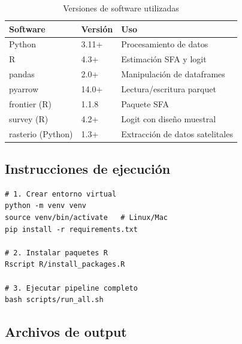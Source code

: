 \documentclass[11pt,a4paper]{article}
\begin{document}
\begin{table}[H]
\centering
\caption{Versiones de software utilizadas}
\label{tab:software_versions}
\begin{threeparttable}
\small
\begin{tabular}{lll}
\toprule
\textbf{Software} & \textbf{Versión} & \textbf{Uso} \\
\midrule
Python & 3.11+ & Procesamiento de datos \\
R & 4.3+ & Estimación SFA y logit \\
pandas & 2.0+ & Manipulación de dataframes \\
pyarrow & 14.0+ & Lectura/escritura parquet \\
frontier (R) & 1.1.8 & Paquete SFA \\
survey (R) & 4.2+ & Logit con diseño muestral \\
rasterio (Python) & 1.3+ & Extracción de datos satelitales \\
\bottomrule
\end{tabular}
\end{threeparttable}
\end{table}

\subsection{Instrucciones de ejecución}

\begin{verbatim}
# 1. Crear entorno virtual
python -m venv venv
source venv/bin/activate   # Linux/Mac
pip install -r requirements.txt

# 2. Instalar paquetes R
Rscript R/install_packages.R

# 3. Ejecutar pipeline completo
bash scripts/run_all.sh
\end{verbatim}

\subsection{Archivos de output}
\end{document}
